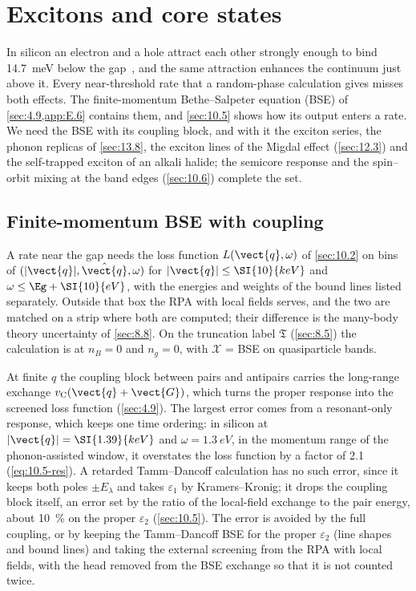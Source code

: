 \section{Excitons and core states}\label{app:E.15}

In silicon an electron and a hole attract each other strongly enough to bind \SI{14.7}{meV} below the gap~\cite{shaklee1970valley}, and the same attraction enhances the continuum just above it. Every near-threshold rate that a random-phase calculation gives misses both effects. The finite-momentum Bethe--Salpeter equation (BSE) of \cref{sec:4.9,app:E.6} contains them, and \cref{sec:10.5} shows how its output enters a rate. We need the BSE with its coupling block, and with it the exciton series, the phonon replicas of \cref{sec:13.8}, the exciton lines of the Migdal effect (\cref{sec:12.3}) and the self-trapped exciton of an alkali halide; the semicore response and the spin--orbit mixing at the band edges (\cref{sec:10.6}) complete the set.

\subsection{Finite-momentum BSE with coupling}

A rate near the gap needs the loss function $L(\vect{q},\omega)$ of \cref{sec:10.2} on bins of $(|\vect{q}|,\hat{\vect{q}},\omega)$ for $|\vect{q}| \le \SI{10}{keV}$ and $\omega \le \Eg + \SI{10}{eV}$, with the energies and weights of the bound lines listed separately. Outside that box the RPA with local fields serves, and the two are matched on a strip where both are computed; their difference is the many-body theory uncertainty of \cref{sec:8.8}. On the truncation label $\mathfrak{T}$ (\cref{sec:8.5}) the calculation is at $n_B = 0$ and $n_g = 0$, with $\mathcal{X}$ = BSE on quasiparticle bands.

At finite $q$ the coupling block between pairs and antipairs carries the long-range exchange $v_{\mathrm{C}}(\vect{q}+\vect{G})$, which turns the proper response into the screened loss function (\cref{sec:4.9}). The largest error comes from a resonant-only response, which keeps one time ordering: in silicon at $|\vect{q}| = \SI{1.39}{keV}$ and $\omega = \SI{1.3}{eV}$, in the momentum range of the phonon-assisted window, it overstates the loss function by a factor of 2.1 (\cref{eq:10.5-res}). A retarded Tamm--Dancoff calculation has no such error, since it keeps both poles $\pm E_\lambda$ and takes $\varepsilon_1$ by Kramers--Kronig; it drops the coupling block itself, an error set by the ratio of the local-field exchange to the pair energy, about \SI{10}{\percent} on the proper $\varepsilon_2$ (\cref{sec:10.5}). The error is avoided by the full coupling, or by keeping the Tamm--Dancoff BSE for the proper $\varepsilon_2$ (line shapes and bound lines) and taking the external screening from the RPA with local fields, with the head removed from the BSE exchange so that it is not counted twice.

